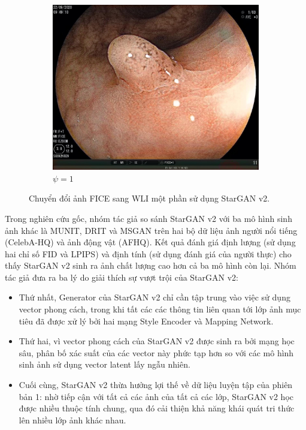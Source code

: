 \documentclass[12pt]{extreport}
\begin{document}
\begin{figure}[H]
\begin{subfigure}[H]{0.19\textwidth}
        \includegraphics[width=\linewidth]{psi/1.jpeg}
        \caption{$ \psi = 1 $}
    \end{subfigure}
    \caption{Chuyển đổi ảnh FICE sang WLI một phần sử dụng StarGAN v2.}
\end{figure}

Trong nghiên cứu gốc, nhóm tác giả so sánh StarGAN v2 với ba mô hình sinh ảnh khác là MUNIT, DRIT và MSGAN trên hai bộ dữ liệu ảnh người nổi tiếng (CelebA-HQ) và ảnh động vật (AFHQ). Kết quả đánh giá định lượng (sử dụng hai chỉ số FID và LPIPS) và định tính (sử dụng đánh giá của người thực) cho thấy StarGAN v2 sinh ra ảnh chất lượng cao hơn cả ba mô hình còn lại. Nhóm tác giả đưa ra ba lý do giải thích sự vượt trội của StarGAN v2:
\begin{itemize}
    \item Thứ nhất, Generator của StarGAN v2 chỉ cần tập trung vào việc sử dụng vector phong cách, trong khi tất các các thông tin liên quan tới lớp ảnh mục tiêu đã được xử lý bởi hai mạng Style Encoder và Mapping Network.
    \item Thứ hai, vì vector phong cách của StarGAN v2 được sinh ra bởi mạng học sâu, phân bố xác suất của các vector này phức tạp hơn so với các mô hình sinh ảnh sử dụng vector latent lấy ngẫu nhiên.
    \item Cuối cùng, StarGAN v2 thừa hưởng lợi thế về dữ liệu luyện tập của phiên bản 1: nhờ tiếp cận với tất cả các ảnh của tất cả các lớp, StarGAN v2 học được nhiều thuộc tính chung, qua đó cải thiện khả năng khái quát tri thức lên nhiều lớp ảnh khác nhau.
\end{itemize}
\end{document}
